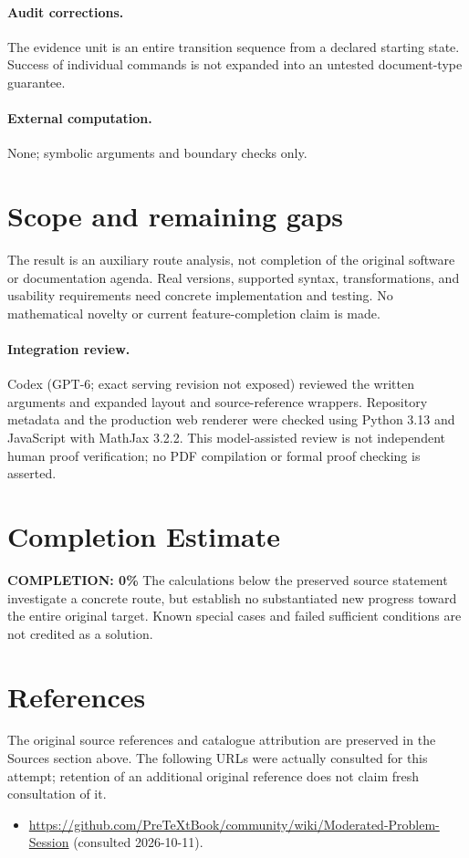 \documentclass[11pt]{article}
\begin{document}
\paragraph{Audit corrections.} The evidence unit is an entire transition sequence from a declared starting state. Success of individual commands is not expanded into an untested document-type guarantee.
\paragraph{External computation.} None; symbolic arguments and boundary checks only.
\section{Scope and remaining gaps}
The result is an auxiliary route analysis, not completion of the original software or documentation agenda. Real versions, supported syntax, transformations, and usability requirements need concrete implementation and testing. No mathematical novelty or current feature-completion claim is made.
\paragraph{Integration review.} Codex (GPT-6; exact serving revision not exposed) reviewed the written arguments and expanded layout and source-reference wrappers. Repository metadata and the production web renderer were checked using Python 3.13 and JavaScript with MathJax 3.2.2. This model-assisted review is not independent human proof verification; no PDF compilation or formal proof checking is asserted.

\section{Completion Estimate}
\noindent\textbf{COMPLETION: 0\%}
The calculations below the preserved source statement investigate a concrete route,
but establish no substantiated new progress toward the entire original target.
Known special cases and failed sufficient conditions are not credited as a solution.
\section{References}
The original source references and catalogue attribution are preserved in the
Sources section above. The following URLs were actually consulted for this attempt;
retention of an additional original reference does not claim fresh consultation of it.
\begin{itemize}
\item \url{https://github.com/PreTeXtBook/community/wiki/Moderated-Problem-Session} (consulted 2026-10-11). 
\end{itemize}
\end{document}
